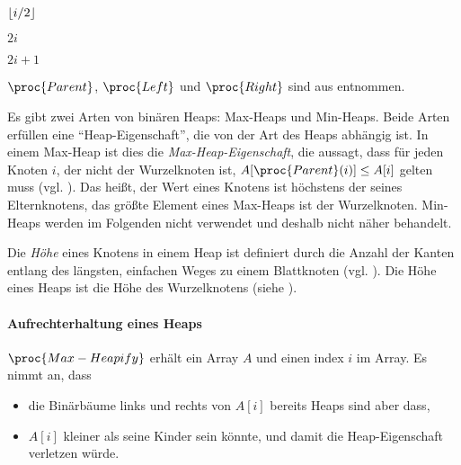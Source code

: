\begin{minipage}{\textwidth}
    \begin{minipage}[t]{.33\textwidth}
        \begin{codebox}
            \li \Return $\left\lfloor i/2 \right\rfloor$
        \end{codebox}
    \end{minipage}
    \begin{minipage}[t]{.33\textwidth}
        \begin{codebox}
            \li \Return $2i$
        \end{codebox}
    \end{minipage}
    \begin{minipage}[t]{.33\textwidth}
        \begin{codebox}
            \li \Return $2i + 1$
        \end{codebox}
    \end{minipage}
\end{minipage}

$\proc{Parent}$, $\proc{Left}$ und $\proc{Right}$ sind aus \cite[152]{clrs2001} entnommen.
\pagebreak[2]

Es gibt zwei Arten von binären Heaps: Max-Heaps und Min-Heaps. Beide Arten erfüllen eine \enquote{Heap-Eigenschaft}, die von der Art des Heaps abhängig ist. In einem Max-Heap ist dies die \emph{Max-Heap-Eigenschaft}, die aussagt, dass für jeden Knoten $i$, der nicht der Wurzelknoten ist, $A[\proc{Parent}(i)] \leq A[i]$ gelten muss (vgl. \cite[92]{hsr1997}). Das heißt, der Wert eines Knotens ist höchstens der seines Elternknotens, das größte Element eines Max-Heaps ist der Wurzelknoten. Min-Heaps werden im Folgenden nicht verwendet und deshalb nicht näher behandelt.

Die \emph{Höhe} eines Knotens in einem Heap ist definiert durch die Anzahl der Kanten entlang des längsten, einfachen Weges zu einem Blattknoten (vgl. \cite[153]{clrs2001}). Die Höhe eines Heaps ist die Höhe des Wurzelknotens (siehe ).



\paragraph{Aufrechterhaltung eines Heaps}

$\proc{Max-Heapify}$ erhält ein Array $A$ und einen index $i$ im Array. Es nimmt an, dass
\begin{itemize}
    \item die Binärbäume links und rechts von $A[i]$ bereits Heaps sind aber dass,
    \item $A[i]$ kleiner als seine Kinder sein könnte, und damit die Heap-Eigenschaft verletzen würde.
\end{itemize}

